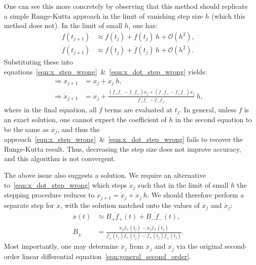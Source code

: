 One can see this more concretely by observing that this method should replicate a simple Runge-Kutta approach in the limit of vanishing step size \(h\) (which this method does not). In the limit of small \(h\), one has:
\begin{align}
    f(t_{j+1}) &\approx f(t_j) + \dot{f}(t_j) \: h +\mathcal{O}(h^2), \\
    \dot{f}(t_{j+1}) &\approx f(t_j) + \ddot{f}(t_j) \: h +\mathcal{O}(h^2). 
\end{align}
Substituting these into equations~\eqref{eqn:x_step_wrong}~\&~\eqref{eqn:x_dot_step_wrong} yields:
\begin{align}
    \Rightarrow x_{j+1} &= x_j + \dot{x}_j \: h , \\
    \Rightarrow \dot{x}_{j+1} &= \dot{x}_j + 
    \frac{(\ddot{f}_+ f_- - \ddot{f}_- f_+)\dot{x}_j  +( \ddot{f}_- \dot{f}_+- \ddot{f}_+ \dot{f}_-)x_j}{\dot{f}_+ f_- - \dot{f}_- f_+}\: h
    , 
\end{align}
where in the final equation, all \(f\) terms are evaluated at \(t_j\). In general, unless \(f\) is an exact solution, one cannot expect the coefficient of \(h\) in the second equation to be the same as \(\ddot{x}_j\), and thus the approach~\eqref{eqn:x_step_wrong}~\&~\eqref{eqn:x_dot_step_wrong} fails to recover the Runge-Kutta result. Thus, decreasing the step size does not improve accuracy, and this algorithm is not convergent.

The above issue also suggests a solution. We require an alternative to~\eqref{eqn:x_dot_step_wrong} which steps \(\dot{x}_j\) such that in the limit of small \(h\) the stepping procedure reduces to \(\dot{x}_{j+1} = \dot{x}_j + \ddot{x}_j\: h\).
We should therefore perform a separate step for \(\dot{x}\), with the solution matched onto the values of \(\dot{x}_j\) and \(\ddot{x}_j\):
\begin{align}
    \dot{x}(t) &\approx  B_+ \dot{f}_+(t) + B_- \dot{f}_-(t), \\
    B_\pm &= \frac{\ddot{x}_j \dot{f}_\mp(t_j) - \dot{x}_j \ddot{f}_\mp(t_j) }{\ddot{f}_\pm(t_j) \dot{f}_\mp(t_j) - \ddot{f}_\mp(t_j) \ddot{f}_\pm(t_j)}. 
    \label{eqn:Bpm}
\end{align}
Most importantly, one may determine \(\ddot{x}_j\) from \(\dot{x}_j\) and \(x_j\) via the original second-order linear differential equation~\eqref{eqn:general_second_order}.

